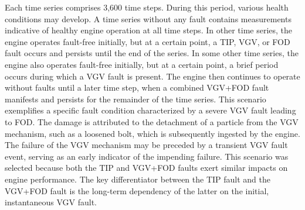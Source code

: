 \documentclass{ecai}
\begin{document}
Each time series comprises 3{,}600 time steps. During this period, various health conditions may develop. A time series without any fault contains measurements indicative of healthy engine operation at all time steps. In other time series, the engine operates fault-free initially, but at a certain point, a TIP, VGV, or FOD fault occurs and persists until the end of the series. In some other time series, the engine also operates fault-free initially, but at a certain point, a brief period occurs during which a VGV fault is present. The engine then continues to operate without faults until a later time step, when a combined VGV+FOD fault manifests and persists for the remainder of the time series. This scenario exemplifies a specific fault condition characterized by a severe VGV fault leading to FOD. The damage is attributed to the detachment of a particle from the VGV mechanism, such as a loosened bolt, which is subsequently ingested by the engine. The failure of the VGV mechanism may be preceded by a transient VGV fault event, serving as an early indicator of the impending failure. This scenario was selected because both the TIP and VGV+FOD faults exert similar impacts on engine performance. The key differentiator between the TIP fault and the VGV+FOD fault is the long-term dependency of the latter on the initial, instantaneous VGV fault.


\end{document}
